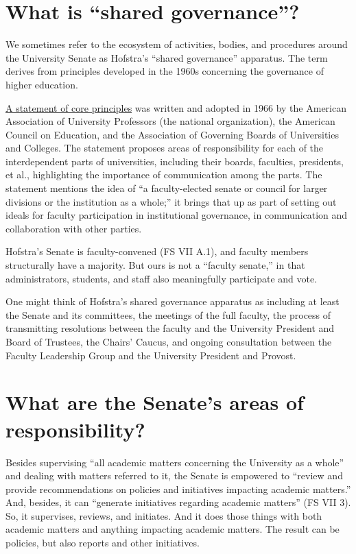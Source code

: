 \documentclass[12pt]{article}
\begin{document}
\section{What is ``shared
governance''?}\label{what-is-shared-governance}

We sometimes refer to the ecosystem of activities, bodies, and
procedures around the University Senate as Hofstra's ``shared
governance'' apparatus. The term derives from principles developed in
the 1960s concerning the governance of higher education.

\href{https://www.aaup.org/reports-publications/aaup-policies-reports/topical-reports/statement-government-colleges-and}{A
statement of core principles} was written and adopted in 1966 by the
American Association of University Professors (the national
organization), the American Council on Education, and the Association of
Governing Boards of Universities and Colleges. The statement proposes
areas of responsibility for each of the interdependent parts of
universities, including their boards, faculties, presidents, et al.,
highlighting the importance of communication among the parts. The
statement mentions the idea of ``a faculty-elected senate or council for
larger divisions or the institution as a whole;'' it brings that up as
part of setting out ideals for faculty participation in institutional
governance, in communication and collaboration with other parties.

Hofstra's Senate is faculty-convened (FS VII A.1), and faculty members
structurally have a majority. But ours is not a ``faculty senate,'' in
that administrators, students, and staff also meaningfully participate
and vote.

One might think of Hofstra's shared governance apparatus as including at
least the Senate and its committees, the meetings of the full faculty,
the process of transmitting resolutions between the faculty and the
University President and Board of Trustees, the Chairs' Caucus, and
ongoing consultation between the Faculty Leadership Group and the
University President and Provost.

\section{What are the Senate's areas of
responsibility?}\label{what-are-the-senates-areas-of-responsibility}

Besides supervising ``all academic matters concerning the University as
a whole'' and dealing with matters referred to it, the Senate is
empowered to ``review and provide recommendations on policies and
initiatives impacting academic matters.'' And, besides, it can
``generate initiatives regarding academic matters'' (FS VII 3). So, it
supervises, reviews, and initiates. And it does those things with both
academic matters and anything impacting academic matters. The result can
be policies, but also reports and other initiatives.
\end{document}
